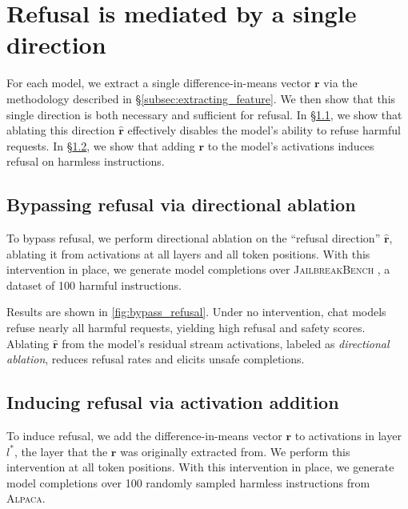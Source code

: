 \documentclass{article}
\begin{document}
\section{Refusal is mediated by a single direction} \label{sec:single_direction}
\label{section_results}

For each model, we extract a single difference-in-means vector $\mathbf{r}$ via the methodology described in \S\ref{subsec:extracting_feature}. 
We then show that this single direction is both necessary and sufficient for refusal.
In \S\ref{subsec:results_bypassing_refusal}, we show that ablating this direction $\hat{\mathbf{r}}$ effectively disables the model's ability to refuse harmful requests.
In \S\ref{subsec:results_inducing_refusal}, we show that adding $\mathbf{r}$ to the model's activations induces refusal on harmless instructions.

\subsection{Bypassing refusal via directional ablation}
\label{subsec:results_bypassing_refusal}

To bypass refusal, we perform directional ablation on the ``refusal direction'' $\hat{\mathbf{r}}$, ablating it from activations at all layers and all token positions.
With this intervention in place, we generate model completions over \textsc{JailbreakBench} \citep{chao2024jailbreakbench}, a dataset of 100 harmful instructions.

Results are shown in \autoref{fig:bypass_refusal}.
Under no intervention, chat models refuse nearly all harmful requests, yielding high refusal and safety scores.
Ablating $\hat{\mathbf{r}}$ from the model's residual stream activations, labeled as \emph{\textit{directional ablation}}, reduces refusal rates and elicits unsafe completions.

\subsection{Inducing refusal via activation addition}
\label{subsec:results_inducing_refusal}

To induce refusal, we add the difference-in-means vector $\mathbf{r}$ to activations in layer $l^*$, the layer that the $\mathbf{r}$ was originally extracted from. We perform this intervention at all token positions. With this intervention in place, we generate model completions over 100 randomly sampled harmless instructions from \textsc{Alpaca}.
\end{document}
